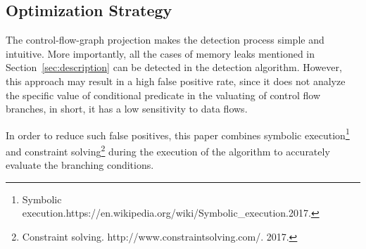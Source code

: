 

\subsection{Optimization Strategy}

The control-flow-graph projection makes the detection process simple and intuitive. More importantly, all the cases of memory leaks mentioned in Section~\ref{sec:description} can be detected in the detection algorithm. However, this approach may result in a high false positive rate, since it does not analyze the specific value of conditional predicate in the valuating of control flow branches, in short, it has a low sensitivity to data flows. 

In order to reduce such false positives, this paper combines symbolic execution\footnote{Symbolic execution.https://en.wikipedia.org/wiki/Symbolic\_execution.2017.} and constraint solving\footnote{Constraint solving. http://www.constraintsolving.com/. 2017.} during the execution of the algorithm to accurately evaluate the branching conditions.
%

